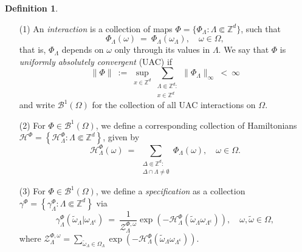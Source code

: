 \documentclass[12pt]{article}
\newcommand{\BB}{\mathscr{B}}
\renewcommand{\H}{\mathcal{H}}
\newcommand{\Z}{\mathbb{Z}}
\newcommand{\ZZ}{\mathcal{Z}}
\newcommand{\set}[1]{\left\{#1\right\}}
\newcommand{\1}{\mathbbm{1}}
\renewcommand{\c}{\mathsf{c}}
\newcommand{\5}{\vspace{0.5cm}}
\renewcommand{\tilde}{\widetilde}
\theoremstyle{definition}
\newtheorem{df}[thm]{Definition}
\begin{document}
\begin{df}~
\begin{itemize}
	\item[(1)] An \textit{interaction} is a collection of maps $\Phi=\{\Phi_\Lambda:\Lambda\Subset\Z^d\}$, such that
$$\Phi_\Lambda(\omega) ~=~ \Phi_\Lambda(\omega_\Lambda), \quad \omega\in\Omega,$$
that is, $\Phi_\Lambda$ depends on $\omega$ only through its values in $\Lambda$. We say that $\Phi$ is \textit{uniformly absolutely convergent} (UAC) if 
$$\|\Phi\| ~:=~ \sup_{x\in\Z^d}\sum_{\substack{\Lambda\Subset\Z^d:\\x\in\Z^d}}\|\Phi_\Lambda\|_\infty ~<~ \infty$$
and write $\BB^1(\Omega)$ for the collection of all UAC interactions on $\Omega$.
	\item[(2)] For $\Phi\in\BB^1(\Omega)$, we define a corresponding collection of Hamiltonians $\H^\Phi=\set{\H_\Lambda^\Phi:\Lambda\Subset\Z^d}$, given by
	$$\H_\Lambda^\Phi(\omega) ~=~ \sum_{\substack{\Delta\Subset\Z^d:\\\Delta\cap\Lambda\neq\emptyset}}\Phi_\Lambda(\omega), \quad \omega\in\Omega.$$
	\item[(3)] For $\Phi\in\BB^1(\Omega)$, we define a \textit{specification} as a collection $\gamma^\Phi=\set{\gamma_\Lambda^\Phi:\Lambda\Subset\Z^d}$ via
	$$\gamma_\Lambda^\Phi(\tilde{\omega}_\Lambda|\omega_{\Lambda^\c}) ~=~ \frac{1}{\ZZ_\Lambda^{\Phi,\omega}}\exp(-\H_\Lambda^\Phi(\tilde{\omega}_\Lambda\omega_{\Lambda^\c})), \quad \omega,\tilde{\omega}\in\Omega,$$
	where $\ZZ_\Lambda^{\Phi,\omega}=\sum_{\tilde{\omega}_\Lambda\in\Omega_\Lambda}\exp(-\H_\Lambda^\Phi(\tilde{\omega}_\Lambda\omega_{\Lambda^\c}))$.
\end{itemize}
\end{df}
\end{document}
